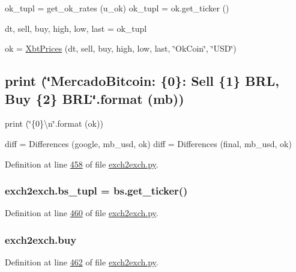 ok\+\_\+tupl = get\+\_\+ok\+\_\+rates (u\+\_\+ok) ok\+\_\+tupl = ok.\+get\+\_\+ticker () 

dt, sell, buy, high, low, last = ok\+\_\+tupl

ok = \hyperlink{classexch2exch_1_1_xbt_prices}{Xbt\+Prices} (dt, sell, buy, high, low, last, \char`\"{}\+Ok\+Coin\char`\"{}, \char`\"{}\+U\+S\+D\char`\"{})

\subsection*{print (\char`\"{}\+Mercado\+Bitcoin\+: \{0\}\+: Sell \{1\} B\+R\+L, Buy \{2\} B\+R\+L\char`\"{}.format (mb))}

print (\char`\"{}\{0\}\textbackslash{}n\char`\"{}.format (ok))

\begin{DoxyVerb}diff = Differences (google, mb_usd, ok)
diff = Differences (final, mb_usd, ok) \end{DoxyVerb}
 

Definition at line \hyperlink{exch2exch_8py_source_l00458}{458} of file \hyperlink{exch2exch_8py_source}{exch2exch.\+py}.

\subsubsection[{\texorpdfstring{bs\+\_\+tupl}{bs_tupl}}]{\setlength{\rightskip}{0pt plus 5cm}exch2exch.\+bs\+\_\+tupl = bs.\+get\+\_\+ticker()}\hypertarget{namespaceexch2exch_a6e4164ccd0ea412356d0b9e4bbe35847}{}\label{namespaceexch2exch_a6e4164ccd0ea412356d0b9e4bbe35847}


Definition at line \hyperlink{exch2exch_8py_source_l00460}{460} of file \hyperlink{exch2exch_8py_source}{exch2exch.\+py}.

\subsubsection[{\texorpdfstring{buy}{buy}}]{\setlength{\rightskip}{0pt plus 5cm}exch2exch.\+buy}\hypertarget{namespaceexch2exch_ab7eb5c06d25fed3d99f5817c49fc2b30}{}\label{namespaceexch2exch_ab7eb5c06d25fed3d99f5817c49fc2b30}


Definition at line \hyperlink{exch2exch_8py_source_l00462}{462} of file \hyperlink{exch2exch_8py_source}{exch2exch.\+py}.

